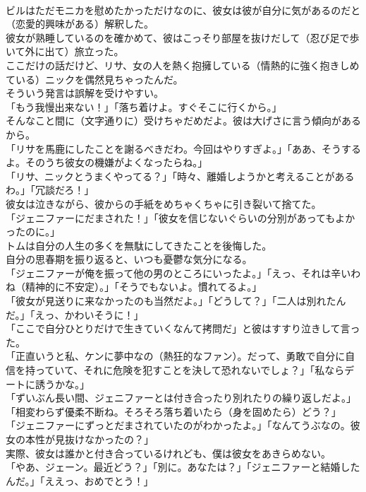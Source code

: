 \documentclass[8pt]{extreport}
\begin{document}
\begin{CJK}{UTF8}{min}
\\	ビルはただモニカを慰めたかっただけなのに、彼女は彼が自分に気があるのだと（恋愛的興味がある）解釈した。
\\	彼女が熟睡しているのを確かめて、彼はこっそり部屋を抜けだして（忍び足で歩いて外に出て）旅立った。
\\	ここだけの話だけど、リサ、女の人を熱く抱擁している（情熱的に強く抱きしめている）ニックを偶然見ちゃったんだ。
\\	そういう発言は誤解を受けやすい。
\\	「もう我慢出来ない！」「落ち着けよ。すぐそこに行くから。」
\\	そんなこと間に（文字通りに）受けちゃだめだよ。彼は大げさに言う傾向があるから。
\\	「リサを馬鹿にしたことを謝るべきだわ。今回はやりすぎよ。」「ああ、そうするよ。そのうち彼女の機嫌がよくなったらね。」
\\	「リサ、ニックとうまくやってる？」「時々、離婚しようかと考えることがあるわ。」「冗談だろ！」
\\	彼女は泣きながら、彼からの手紙をめちゃくちゃに引き裂いて捨てた。
\\	「ジェニファーにだまされた！」「彼女を信じないぐらいの分別があってもよかったのに。」
\\	トムは自分の人生の多くを無駄にしてきたことを後悔した。
\\	自分の思春期を振り返ると、いつも憂鬱な気分になる。
\\	「ジェニファーが俺を振って他の男のところにいったよ。」「えっ、それは辛いわね（精神的に不安定）。」「そうでもないよ。慣れてるよ。」
\\	「彼女が見送りに来なかったのも当然だよ。」「どうして？」「二人は別れたんだ。」「えっ、かわいそうに！」
\\	「ここで自分ひとりだけで生きていくなんて拷問だ」と彼はすすり泣きして言った。
\\	「正直いうと私、ケンに夢中なの（熱狂的なファン）。だって、勇敢で自分に自信を持っていて、それに危険を犯すことを決して恐れないでしょ？」「私ならデートに誘うかな。」
\\	「ずいぶん長い間、ジェニファーとは付き合ったり別れたりの繰り返しだよ。」「相変わらず優柔不断ね。そろそろ落ち着いたら（身を固めたら）どう？」
\\	「ジェニファーにずっとだまされていたのがわかったよ。」「なんてうぶなの。彼女の本性が見抜けなかったの？」
\\	実際、彼女は誰かと付き合っているけれども、僕は彼女をあきらめない。
\\	「やあ、ジェーン。最近どう？」「別に。あなたは？」「ジェニファーと結婚したんだ。」「ええっ、おめでとう！」

\end{CJK}
\end{document}
